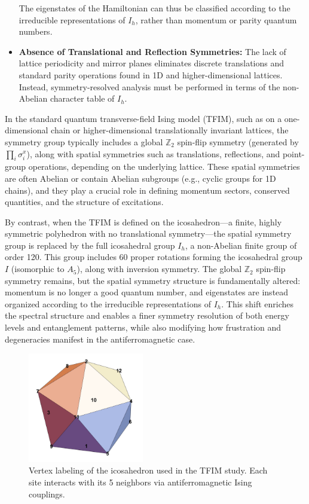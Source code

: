 \documentclass{article}
\begin{document}
\begin{itemize}
    The eigenstates of the Hamiltonian can thus be classified according to the irreducible representations of $I_h$, rather than momentum or parity quantum numbers.

    \item \textbf{Absence of Translational and Reflection Symmetries:} The lack of lattice periodicity and mirror planes eliminates discrete translations and standard parity operations found in 1D and higher-dimensional lattices. Instead, symmetry-resolved analysis must be performed in terms of the non-Abelian character table of $I_h$.
\end{itemize}


In the standard quantum transverse-field Ising model (TFIM), such as on a one-dimensional chain or higher-dimensional translationally invariant lattices, the symmetry group typically includes a global $\mathbb{Z}_2$ spin-flip symmetry (generated by $\prod_i \sigma_i^x$), along with spatial symmetries such as translations, reflections, and point-group operations, depending on the underlying lattice. These spatial symmetries are often Abelian or contain Abelian subgroups (e.g., cyclic groups for 1D chains), and they play a crucial role in defining momentum sectors, conserved quantities, and the structure of excitations.

By contrast, when the TFIM is defined on the icosahedron—a finite, highly symmetric polyhedron with no translational symmetry—the spatial symmetry group is replaced by the full icosahedral group $I_h$, a non-Abelian finite group of order 120. This group includes 60 proper rotations forming the icosahedral group $I$ (isomorphic to $A_5$), along with inversion symmetry. The global $\mathbb{Z}_2$ spin-flip symmetry remains, but the spatial symmetry structure is fundamentally altered: momentum is no longer a good quantum number, and eigenstates are instead organized according to the irreducible representations of $I_h$. This shift enriches the spectral structure and enables a finer symmetry resolution of both energy levels and entanglement patterns, while also modifying how frustration and degeneracies manifest in the antiferromagnetic case.

\begin{figure}[h!]
    \centering
    \includegraphics[width=0.45\textwidth]{icosahedron.jpg}
    \caption{Vertex labeling of the icosahedron used in the TFIM study. Each site interacts with its 5 neighbors via antiferromagnetic Ising couplings.}
    \label{fig:icosahedron}
\end{figure}
\end{document}
